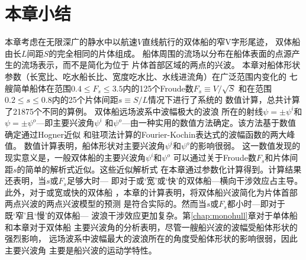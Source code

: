 \section{本章小结}
本章考虑在无限深广的静水中以航速$V$直线航行的双体船的窄V字形尾迹，
双体船由长$L$间距$S$的完全相同的片体组成。
船体周围的流场以分布在船体表面的点源产生的流场表示，而不是简化为位于
片体首部区域的两点的兴波。
本章对船体形状参数（长宽比、吃水船长比、宽度吃水比、水线进流角）在广泛范围内变化的
七艘简单船体在范围$0.4\le F_s\le 3.5$内的125个Froude数$F_s\equiv V/\sqrt{S}$
和在范围$0.2\le s \le 0.8$内的25个片体间距$s\equiv S/L$情况下进行了系统的
数值计算，总共计算了21875个不同的算例。
双体船远场波系中波幅极大的波浪
所在的射线$\psi=\pm\psi^i$和$\psi=\pm\psi^o$---即主要兴波角$\psi^i$
和$\psi^o$---由一种实用的数值方法确定。该方法基于数值确定通过Hogner近似
和驻项法计算的Fourier-Kochin表达式的波幅函数的两大峰值。
数值计算表明，船体形状对主要兴波角$\psi^i$和$\psi^o$的影响很弱。
这一数值发现的现实意义是，一般双体船的主要兴波角$\psi^i$和$\psi^o$
可以通过关于Froude数$F_s$和片体间距$s$的简单的解析式近似。这些近似解析式
在本章通过参数化计算得到。计算结果还表明，当$s$或$F_s$足够大时---
即对于或`宽'或`快'的双体船---横向干涉效应占主导。此外，对于或宽或快的双体船
，本章的计算表明，将双体船兴波简化为片体首部两点兴波的两点兴波模型的预测
是符合实际的。然而当$s$或$F_s$都小时---即对于既`窄'且`慢'的双体船---
波浪干涉效应更加复杂。第\ref{chap:monohull}章对于单体船和本章对于双体船
主要兴波角的分析表明，尽管一艘船兴波的波幅受船体形状的强烈影响，
远场波系中波幅最大的波浪所在的角度受船体形状的影响很弱，因此主要兴波角
主要是船兴波的运动学特性。


